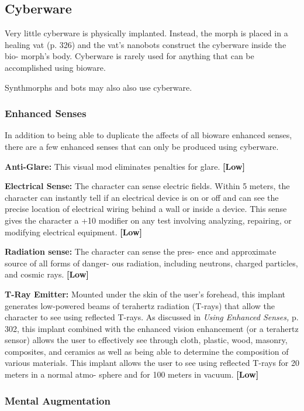 \subsection{Cyberware}

Very little cyberware is physically implanted. Instead, 
the morph is placed in a healing vat (p. 326) and the 
vat's nanobots construct the cyberware inside the bio-
morph's body. Cyberware is rarely used for anything 
that can be accomplished using bioware.

Synthmorphs and bots may also also use cyberware.

\subsubsection{Enhanced Senses}

In addition to being able to duplicate the affects of all 
bioware enhanced senses, there are a few enhanced 
senses that can only be produced using cyberware.

\textbf{Anti-Glare:} This visual mod eliminates penalties for 
glare. \textbf{[Low]}

\textbf{Electrical Sense:} The character can sense electric 
fields. Within 5 meters, the character can instantly 
tell if an electrical device is on or off and can see the 
precise location of electrical wiring behind a wall or 
inside a device. This sense gives the character a +10 
modifier on any test involving analyzing, repairing, or 
modifying electrical equipment. \textbf{[Low]}

\textbf{Radiation sense:} The character can sense the pres-
ence and approximate source of all forms of danger-
ous radiation, including neutrons, charged particles, 
and cosmic rays. \textbf{[Low]}

\textbf{T-Ray Emitter:} Mounted under the skin of the 
user's forehead, this implant generates low-powered 
beams of terahertz radiation (T-rays) that allow the 
character to see using reflected T-rays. As discussed in 
\textit{Using Enhanced Senses, }p. 302, this implant combined 
with the enhanced vision enhancement (or a terahertz 
sensor) allows the user to effectively see through cloth, 
plastic, wood, masonry, composites, and ceramics as 
well as being able to determine the composition of 
various materials. This implant allows the user to see 
using reflected T-rays for 20 meters in a normal atmo-
sphere and for 100 meters in vacuum. \textbf{[Low]}

\subsubsection{Mental Augmentation}

